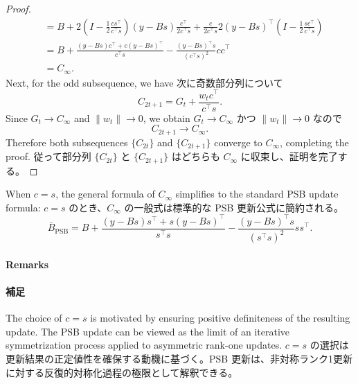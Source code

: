 \documentclass[0_main]{subfiles}
\begin{document}
\begin{proof}
\begin{align*}
         & = B+ 2\left(I-\frac{1}{2}\frac{cs^\top}{c^\top s}\right) (y-Bs) \frac{c^\top}{2c^\top s} + \frac{c}{2c^\top s} 2(y-Bs)^\top \left(I-\frac{1}{2}\frac{sc^\top}{c^\top s}\right) \\
         & = B + \frac{(y - Bs)c^\top + c(y - Bs)^\top}{c^\top s} - \frac{(y - Bs)^\top s}{(c^\top s)^2} c c^\top                                                                         \\
         & = C_{\infty}.
    \end{align*}
    \ifEn
        Next, for the odd subsequence, we have
    \else
        次に奇数部分列について
    \fi
    \begin{equation*}
        C_{2t+1}
        =
        G_t+\frac{w_t c^\top}{c^\top s}.
    \end{equation*}
    \ifEn
        Since $G_t\to C_{\infty}$ and $\lVert w_t \rVert\to0$, we obtain
    \else
        $G_t\to C_{\infty}$ かつ $\lVert w_t \rVert\to0$ なので
    \fi
    \begin{equation*}
        C_{2t+1} \to C_{\infty}.
    \end{equation*}
    \ifEn
        Therefore both subsequences $\{ C_{2t} \}$ and $\{ C_{2t+1} \}$ converge to $C_{\infty}$,
        completing the proof.
    \else
        従って部分列 $\{ C_{2t} \}$ と $\{ C_{2t+1} \}$ はどちらも $C_{\infty}$ に収束し、証明を完了する。
    \fi
    \myQED
\end{proof}

\ifEn
    When $c = s$, the general formula of $C_{\infty}$ simplifies to the standard PSB update formula:
\else
    $c = s$ のとき、$C_{\infty}$ の一般式は標準的な PSB 更新公式に簡約される。
\fi
\begin{equation*}
    \bar{B}_{\mathrm{PSB}} = B + \frac{(y - Bs)s^\top + s(y - Bs)^\top}{s^\top s} - \frac{(y - Bs)^\top s}{(s^\top s)^2} ss^\top.
\end{equation*}

\ifEn
    \paragraph{Remarks}
\else
    \paragraph{補足}
\fi

\ifEn
    The choice of $c = s$ is motivated by ensuring positive definiteness of the resulting update. The PSB update can be viewed as the limit of an iterative symmetrization process applied to asymmetric rank-one updates.
\else
    $c = s$ の選択は更新結果の正定値性を確保する動機に基づく。PSB 更新は、非対称ランク1更新に対する反復的対称化過程の極限として解釈できる。
\fi
\end{document}
